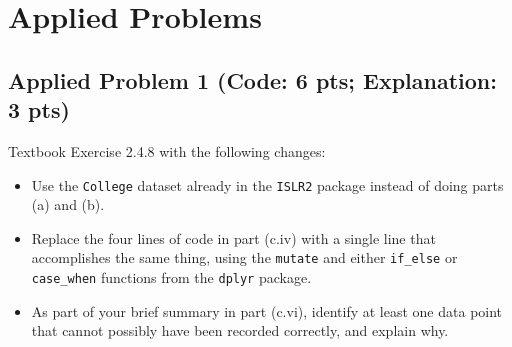 \documentclass[
]{article}
\newenvironment{Shaded}{\begin{snugshade}}{\end{snugshade}}
\newcommand{\AttributeTok}[1]{\textcolor[rgb]{0.77,0.63,0.00}{#1}}
\newcommand{\CommentTok}[1]{\textcolor[rgb]{0.56,0.35,0.01}{\textit{#1}}}
\newcommand{\DecValTok}[1]{\textcolor[rgb]{0.00,0.00,0.81}{#1}}
\newcommand{\FunctionTok}[1]{\textcolor[rgb]{0.00,0.00,0.00}{#1}}
\newcommand{\NormalTok}[1]{#1}
\newcommand{\SpecialCharTok}[1]{\textcolor[rgb]{0.00,0.00,0.00}{#1}}
\newcommand{\StringTok}[1]{\textcolor[rgb]{0.31,0.60,0.02}{#1}}
\providecommand{\tightlist}{%
  \setlength{\itemsep}{0pt}\setlength{\parskip}{0pt}}
\begin{document}
\hypertarget{applied-problems}{%
\section{Applied Problems}\label{applied-problems}}

\hypertarget{applied-problem-1-code-6-pts-explanation-3-pts}{%
\subsection{Applied Problem 1 (Code: 6 pts; Explanation: 3
pts)}\label{applied-problem-1-code-6-pts-explanation-3-pts}}

Textbook Exercise 2.4.8 with the following changes:

\begin{itemize}
\tightlist
\item
  Use the \texttt{College} dataset already in the \texttt{ISLR2} package
  instead of doing parts (a) and (b).
\item
  Replace the four lines of code in part (c.iv) with a single line that
  accomplishes the same thing, using the \texttt{mutate} and either
  \texttt{if\_else} or \texttt{case\_when} functions from the
  \texttt{dplyr} package.
\item
  As part of your brief summary in part (c.vi), identify at least one
  data point that cannot possibly have been recorded correctly, and
  explain why.
\end{itemize}

\begin{Shaded}
\end{Shaded}
\end{document}
